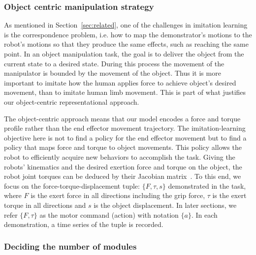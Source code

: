 \subsubsection{Object centric manipulation strategy}
\label{sec:objectlevel}
As mentioned in Section~\ref{sec:related}, one of the challenges in
imitation learning is the correspondence problem, i.e. how to map the
demonstrator's motions to the robot's motions so that they produce the
same effects, such as reaching the same
point. %
In an object manipulation task, the goal is to deliver the object from
the current state to a desired state. During this process the movement
of the manipulator is bounded by the movement of the object. Thus it is
more important to imitate how the human applies force to achieve object's
desired movement, than to imitate human limb movement.  This is part
of what justifies our object-centric representational approach.

The object-centric approach means that our model encodes a force and
torque profile rather than the end effector movement trajectory.  The
imitation-learning objective here is not to find a policy for the end
effector movement but to find a policy that maps  force and torque
to object movements. This policy allows the robot to efficiently
acquire new behaviors to accomplish the
task. %
Giving the robots' kinematics and the desired exertion force and torque
on the object, the robot joint torques can be deduced by their Jacobian
matrix~\citep{okamura2000overview}. To this end, we focus on the
force-torque-displacement tuple: $\{F,\tau,s\}$ demonstrated in the
task, where $F$ is the exert force in all directions including the
grip force, $\tau$ is the exert torque in all directions and $s$ is
the object displacement. In later sections, we refer $\{F,\tau\}$ as
the motor command (action) with notation $\{a\}$. In each
demonstration, a time series of the tuple is recorded.



\subsubsection{Deciding the number of modules}
\label{sec:cluster}

